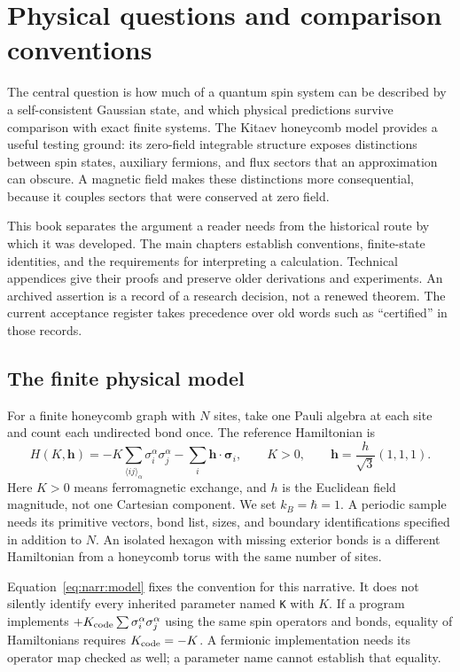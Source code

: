 \chapter{Physical questions and comparison conventions}
\label{narr:scope}

The central question is how much of a quantum spin system can be described by a
self-consistent Gaussian state, and which physical predictions survive comparison
with exact finite systems. The Kitaev honeycomb model provides a useful testing
ground: its zero-field integrable structure exposes distinctions between spin
states, auxiliary fermions, and flux sectors that an approximation can obscure.
A magnetic field makes these distinctions more consequential, because it couples
sectors that were conserved at zero field.

This book separates the argument a reader needs from the historical route by
which it was developed. The main chapters establish conventions, finite-state
identities, and the requirements for interpreting a calculation. Technical
appendices give their proofs and preserve older derivations and experiments.
An archived assertion is a record of a research decision, not a renewed theorem.
The current acceptance register takes precedence over old words such as
``certified'' in those records.

\section{The finite physical model}
\label{narr:model}
For a finite honeycomb graph with $N$ sites, take one Pauli algebra at each site
and count each undirected bond once. The reference Hamiltonian is
\begin{equation}
 H(K,\bm h)=-K\sum_{\langle ij\rangle_\alpha}
 \sigma_i^\alpha\sigma_j^\alpha-\sum_i\bm h\cdot\bm\sigma_i,
 \qquad K>0,\qquad \bm h=\frac{h}{\sqrt3}(1,1,1).
 \label{eq:narr:model}
\end{equation}
Here $K>0$ means ferromagnetic exchange, and $h$ is the Euclidean field magnitude,
not one Cartesian component. We set $k_B=\hbar=1$. A periodic sample needs its
primitive vectors, bond list, sizes, and boundary identifications specified in
addition to $N$. An isolated hexagon with missing exterior bonds is a different
Hamiltonian from a honeycomb torus with the same number of sites.

Equation~\eqref{eq:narr:model} fixes the convention for this narrative. It does
not silently identify every inherited parameter named \texttt{K} with $K$.
If a program implements $+K_{\rm code}\sum\sigma_i^\alpha\sigma_j^\alpha$ using
the same spin operators and bonds, equality of Hamiltonians requires
$K_{\rm code}=-K$. A fermionic implementation needs its operator map checked as
well; a parameter name cannot establish that equality.

